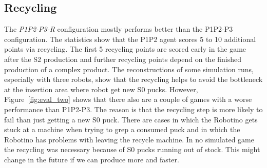 \subsection{Recycling}
The \textit{P1P2-P3-R} configuration mostly performs better than the P1P2-P3 configuration. The statistics show that the P1P2 agent scores 5 to 10 additional points via recycling. The first 5 recycling points are scored early in the game after the S2 production and further recycling points depend on the finished production of a complex product. The reconstructions of some simulation runs, especially with three robots, show that the recycling helps to avoid the bottleneck at the insertion area where robot get new S0 pucks. However, Figure~\ref{fig:eval_two} shows that there also are a couple of games with a worse performance than P1P2-P3. The reason is that the recycling step is more likely to fail than just getting a new S0 puck. There are cases in which the Robotino gets stuck at a machine when trying to grep a consumed puck and in which the Robotino has problems with leaving the recycle machine. In no simulated game the recycling was necessary because of S0 pucks running out of stock. This might change in the future if we can produce more and faster.

